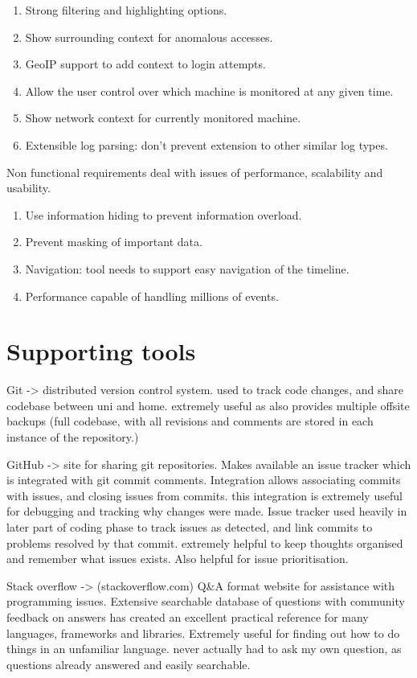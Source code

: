 \begin{enumerate}
\item{Strong filtering and highlighting options.}
\item{Show surrounding context for anomalous accesses.}
\item{GeoIP support to add context to login attempts.}
\item{Allow the user control over which machine is monitored at any given time.}
\item{Show network context for currently monitored machine.}
\item{Extensible log parsing: don't prevent extension to other similar log types.}
\end{enumerate}

Non functional requirements deal with issues of performance, scalability and usability.
\begin{enumerate}
\item{Use information hiding to prevent information overload.}
\item{Prevent masking of important data.}
\item{Navigation: tool needs to support easy navigation of the timeline.}
\item{Performance capable of handling millions of events.}
\end{enumerate}

\section{Supporting tools}
Git -> distributed version control system. used to track code changes, and share codebase between uni and home. extremely useful as also provides multiple offsite backups (full codebase, with all revisions and comments are stored in each instance of the repository.)

GitHub -> site for sharing git repositories. Makes available an issue tracker which is integrated with git commit comments. Integration allows associating commits with issues, and closing issues from commits. this integration is extremely useful for debugging and tracking why changes were made. Issue tracker used heavily in later part of coding phase to track issues as detected, and link commits to problems resolved by that commit.
extremely helpful to keep thoughts organised and remember what issues exists. Also helpful for issue prioritisation.

Stack overflow -> (stackoverflow.com) Q\&A format website for assistance with programming issues. Extensive searchable database of questions with community feedback on answers has created an excellent practical reference for many languages, frameworks and libraries.  Extremely useful for finding out how to do things in an unfamiliar language. never actually had to ask my own question, as questions already answered and easily searchable.